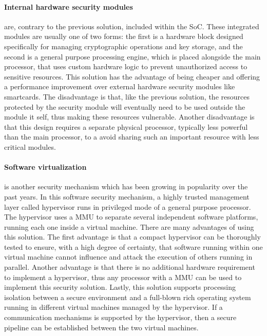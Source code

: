 \paragraph{\textbf{Internal hardware security modules}} are, contrary to the previous solution, included within the \ac{SoC}. These integrated modules are usually one of two forms: the first is a hardware block designed specifically for managing cryptographic operations and key storage, and the second is a general purpose processing engine, which is placed alongside the main processor, that uses custom hardware logic to prevent unauthorized access to sensitive resources. This solution has the advantage of being cheaper and offering a performance improvement over external hardware security modules like smartcards. The disadvantage is that, like the previous solution, the resources protected by the security module will eventually need to be used outside the module it self, thus making these resources vulnerable. Another disadvantage is that this design requires a separate physical processor, typically less powerful than the main processor, to a avoid sharing such an important resource with less critical modules.


\paragraph{\textbf{Software virtualization}} is another security mechanism which has been growing in popularity over the past years. In this software security mechanism, a highly trusted management layer called hypervisor runs in privileged mode of a general purpose processor. The hypervisor uses a \ac{MMU} to separate several independent software platforms, running each one inside a virtual machine. There are many advantages of using this solution. The first advantage is that a compact hypervisor can be thoroughly tested to ensure, with a high degree of certainty, that software running within one virtual machine cannot influence and attack the execution of others running in parallel. Another advantage is that there is no additional hardware requirement to implement a hypervisor, thus any processor with a \ac{MMU} can be used to implement this security solution. Lastly, this solution supports processing isolation between a secure environment and a full-blown rich operating system running in different virtual machines managed by the hypervisor. If a communication mechanisms is supported by the hypervisor, then a secure pipeline can be established between the two virtual machines.

